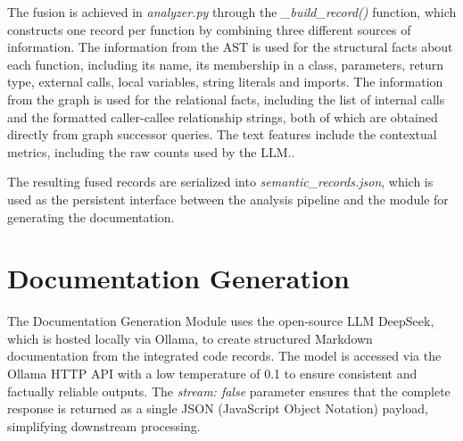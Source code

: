 \par The fusion is achieved in \textit{analyzer.py} through the \textit{\_build\_record()} function, which constructs one record per function by combining three different sources of information. The information from the AST is used for the structural facts about each function, including its name, its membership in a class, parameters, return type, external calls, local variables, string literals and imports. The information from the graph is used for the relational facts, including the list of internal calls and the formatted caller-callee relationship strings, both of which are obtained directly from graph successor queries. The text features include the contextual metrics, including the raw counts used by the LLM..



\par The resulting fused records are serialized into \textit{semantic\_records.json}, which is used as the persistent interface between the analysis pipeline and the module for generating the documentation.


\section{Documentation Generation}
\hspace{0.5cm}
The Documentation Generation Module uses the open-source LLM DeepSeek, which is hosted locally via Ollama, to create structured Markdown documentation from the integrated code records. The model is accessed via the Ollama HTTP API with a low temperature of 0.1 to ensure consistent and factually reliable outputs. The \textit{stream: false} parameter ensures that the complete response is returned as a single JSON (JavaScript Object Notation) payload, simplifying downstream processing.


